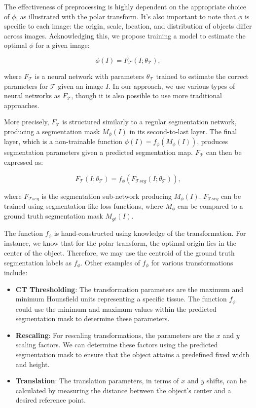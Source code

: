 The effectiveness of preprocessing is highly dependent on the appropriate choice of \(\phi\), as illustrated with the polar transform. It's also important to note that \(\phi\) is specific to each image: the origin, scale, location, and distribution of objects differ across images. Acknowledging this, we propose training a model to estimate the optimal \(\phi\) for a given image:

\begin{equation}
	\phi(I) = F_{\mathcal{T}}(I; \theta_{\mathcal{T}}),
\end{equation}

where $F_{\mathcal{T}}$ is a neural network with parameters $\theta_{\mathcal{T}}$ trained to estimate the correct parameters for $\mathcal{T}$ given an image $I$. In our approach, we use various types of neural networks as $F_{\mathcal{T}}$, though it is also possible to use more traditional approaches.

More precisely, $F_{\mathcal{T}}$ is structured similarly to a regular segmentation network, producing a segmentation mask $M_\phi(I)$ in its second-to-last layer. The final layer, which is a non-trainable function $\phi(I) = f_\phi(M_\phi(I))$, produces segmentation parameters given a predicted segmentation map. $F_{\mathcal{T}}$ can then be expressed as:

\begin{equation}
	F_{\mathcal{T}}(I; \theta_{\mathcal{T}}) = f_\phi(F_{\mathcal{T}seg}(I; \theta_{\mathcal{T}})),
\end{equation}

where $F_{\mathcal{T}seg}$ is the segmentation sub-network producing $M_\phi(I)$. $F_{\mathcal{T}seg}$ can be trained using segmentation-like loss functions, where $M_\phi$ can be compared to a ground truth segmentation mask $M_{gt}(I)$. 

The function $f_\phi$ is hand-constructed using knowledge of the transformation. For instance, we know that for the polar transform, the optimal origin lies in the center of the object. Therefore, we may use the centroid of the ground truth segmentation labels as $f_\phi$. Other examples of \( f_\phi \) for various transformations include:

\begin{itemize}
	\item \textbf{CT Thresholding}: The transformation parameters are the maximum and minimum Hounsfield units representing a specific tissue. The function \( f_\phi \) could use the minimum and maximum values within the predicted segmentation mask to determine these parameters.
	\item \textbf{Rescaling}: For rescaling transformations, the parameters are the \( x \) and \( y \) scaling factors. We can determine these factors using the predicted segmentation mask to ensure that the object attains a predefined fixed width and height.
	\item \textbf{Translation}: The translation parameters, in terms of \( x \) and \( y \) shifts, can be calculated by measuring the distance between the object's center and a desired reference point.
\end{itemize}

